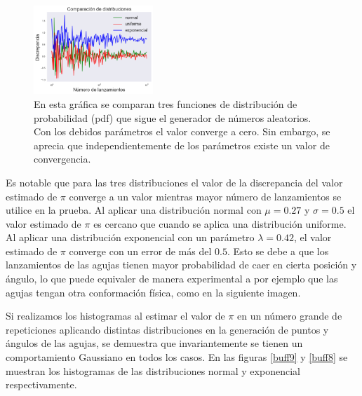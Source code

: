 \documentclass{rbf}
\begin{document}
\begin{figure}[tbp!]
 \centering
  \includegraphics[width=0.4\textwidth]{figures/dist.png}
	\caption{En esta gráfica se comparan tres funciones de distribución de probabilidad (pdf) que sigue el generador de números aleatorios. Con los debidos parámetros el valor converge a cero. Sin embargo, se aprecia que independientemente de los parámetros existe un valor de convergencia. }
 \label{buff5}
\end{figure}

Es notable que para las tres distribuciones el valor de la discrepancia del valor estimado de $\pi$ converge a un valor mientras mayor número de lanzamientos se utilice en la prueba. Al aplicar una distribución normal con $\mu=0.27$ y  $\sigma=0.5$ el valor estimado de $\pi$ es cercano que cuando se aplica una distribución uniforme. Al aplicar una distribución exponencial con un parámetro $\lambda=0.42$, el valor estimado de $\pi$ converge con un error de más del $0.5$. Esto se debe a que los lanzamientos de las agujas tienen mayor probabilidad de caer en cierta posición y ángulo, lo que puede equivaler de manera experimental a por ejemplo que las agujas tengan otra conformación física, como en la siguiente imagen.


Si realizamos los histogramas al estimar el valor de $\pi$ en un número grande de repeticiones aplicando distintas distribuciones en la generación de puntos y ángulos de las agujas, se demuestra que invariantemente se tienen un comportamiento Gaussiano en todos los casos.
 En las figuras \ref{buff9} y \ref{buff8} se muestran los histogramas de las distribuciones normal y exponencial respectivamente. 
\end{document}
